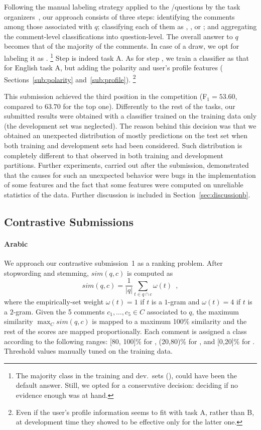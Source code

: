 Following the manual labeling strategy applied to the \yes/\no questions by the 
task organizers~\cite{Marquez-EtAl:2015:SemEval}, our approach consists of three 
steps:
\Ni identifying the \good comments among those associated with $q$;
\Nii classifying each of them as \yes, \no, or \unsure; and 
\Niii aggregating the comment-level classifications into question-level. The 
overall answer to $q$ becomes that of the majority of the comments. In case of a
draw, we opt for labeling it as \unsure.%
\footnote{The majority class in the training and dev.\ sets (\yes), could have 
been the default answer. Still, we opted for a conservative decision: deciding 
\unsure if no evidence enough was at hand.}
Step \Ni is indeed task A. As for step \Nii, we train a classifier as that for 
English task A, but adding the polarity and user's profile features (\cf 
Sections~\ref{sub:polarity} and~\ref{sub:profile}).%
\footnote{Even if the user's profile information seems to fit with task A, 
rather than B, at development time they showed to be effective only for the 
latter one.}

This submission achieved the third position in the competition (F$_1=53.60$, 
compared to $63.70$ for the top one). Differently to the rest of the tasks, our 
submitted results were obtained with a classifier trained on the training data 
only (the development set was neglected). The reason behind this decision was 
that we obtained an unexpected distribution of mostly \yes predictions on the 
test set when both training and development sets had been considered. Such 
distribution is completely different to that observed in both training and 
development partitions. Further experiments, carried out after the submission, 
demonstrated that the causes for such an unexpected behavior were bugs in the 
implementation of some features and the fact that some features were computed on 
unreliable statistics of the data. Further discussion is included in 
Section~\ref{sec:discussionb}.


\subsection{Contrastive Submissions}
\label{sub:contrastive}

\paragraph{Arabic} 

We approach our contrastive submission~1 as a ranking problem. After 
stopwording and stemming, $sim(q,c)$ is computed as 
\begin{equation}
 sim(q,c) = \frac{1}{|q|} \sum_{t\in q\cap c} \omega(t) \enspace ,
 \label{eq:overlap}
\end{equation}
% 
where the empirically-set weight $\omega(t)=1$ if $t$ is a $1$-gram and 
$\omega(t)=4$ if $t$ is a $2$-gram. Given the 5 comments $c_1,\ldots,c_5\in C$ 
associated to $q$, the maximum similarity $\max_C sim(q,c)$ is mapped to a 
maximum 100\% similarity and the rest of the scores are mapped proportionally. 
Each comment is assigned a class according to the following ranges: [80, 100]\% 
for \dir, (20,80)\% for \rel, and [0,20]\% for \irel. Threshold values manually 
tuned on the training data.


